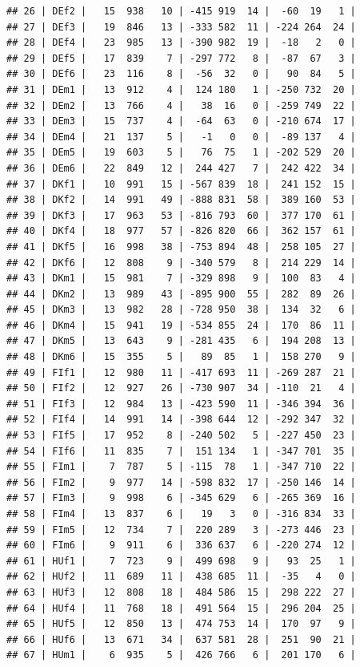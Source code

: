 \documentclass[
  finnish,
]{book}
\begin{document}
\begin{verbatim}
## 26 | DEf2 |   15  938   10 | -415 919  14 |  -60  19   1 |
## 27 | DEf3 |   19  846   13 | -333 582  11 | -224 264  24 |
## 28 | DEf4 |   23  985   13 | -390 982  19 |  -18   2   0 |
## 29 | DEf5 |   17  839    7 | -297 772   8 |  -87  67   3 |
## 30 | DEf6 |   23  116    8 |  -56  32   0 |   90  84   5 |
## 31 | DEm1 |   13  912    4 |  124 180   1 | -250 732  20 |
## 32 | DEm2 |   13  766    4 |   38  16   0 | -259 749  22 |
## 33 | DEm3 |   15  737    4 |  -64  63   0 | -210 674  17 |
## 34 | DEm4 |   21  137    5 |   -1   0   0 |  -89 137   4 |
## 35 | DEm5 |   19  603    5 |   76  75   1 | -202 529  20 |
## 36 | DEm6 |   22  849   12 |  244 427   7 |  242 422  34 |
## 37 | DKf1 |   10  991   15 | -567 839  18 |  241 152  15 |
## 38 | DKf2 |   14  991   49 | -888 831  58 |  389 160  53 |
## 39 | DKf3 |   17  963   53 | -816 793  60 |  377 170  61 |
## 40 | DKf4 |   18  977   57 | -826 820  66 |  362 157  61 |
## 41 | DKf5 |   16  998   38 | -753 894  48 |  258 105  27 |
## 42 | DKf6 |   12  808    9 | -340 579   8 |  214 229  14 |
## 43 | DKm1 |   15  981    7 | -329 898   9 |  100  83   4 |
## 44 | DKm2 |   13  989   43 | -895 900  55 |  282  89  26 |
## 45 | DKm3 |   13  982   28 | -728 950  38 |  134  32   6 |
## 46 | DKm4 |   15  941   19 | -534 855  24 |  170  86  11 |
## 47 | DKm5 |   13  643    9 | -281 435   6 |  194 208  13 |
## 48 | DKm6 |   15  355    5 |   89  85   1 |  158 270   9 |
## 49 | FIf1 |   12  980   11 | -417 693  11 | -269 287  21 |
## 50 | FIf2 |   12  927   26 | -730 907  34 | -110  21   4 |
## 51 | FIf3 |   12  984   13 | -423 590  11 | -346 394  36 |
## 52 | FIf4 |   14  991   14 | -398 644  12 | -292 347  32 |
## 53 | FIf5 |   17  952    8 | -240 502   5 | -227 450  23 |
## 54 | FIf6 |   11  835    7 |  151 134   1 | -347 701  35 |
## 55 | FIm1 |    7  787    5 | -115  78   1 | -347 710  22 |
## 56 | FIm2 |    9  977   14 | -598 832  17 | -250 146  14 |
## 57 | FIm3 |    9  998    6 | -345 629   6 | -265 369  16 |
## 58 | FIm4 |   13  837    6 |   19   3   0 | -316 834  33 |
## 59 | FIm5 |   12  734    7 |  220 289   3 | -273 446  23 |
## 60 | FIm6 |    9  911    6 |  336 637   6 | -220 274  12 |
## 61 | HUf1 |    7  723    9 |  499 698   9 |   93  25   1 |
## 62 | HUf2 |   11  689   11 |  438 685  11 |  -35   4   0 |
## 63 | HUf3 |   12  808   18 |  484 586  15 |  298 222  27 |
## 64 | HUf4 |   11  768   18 |  491 564  15 |  296 204  25 |
## 65 | HUf5 |   12  850   13 |  474 753  14 |  170  97   9 |
## 66 | HUf6 |   13  671   34 |  637 581  28 |  251  90  21 |
## 67 | HUm1 |    6  935    5 |  426 766   6 |  201 170   6 |

\end{verbatim}
\end{document}
